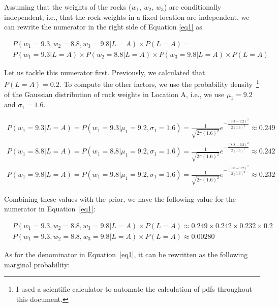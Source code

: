 \documentclass[leqno]{article}
\begin{document}
\noindent Assuming that the weights of the rocks ($w_1$, $w_2$, $w_3$) are conditionally independent, i.e., that the rock weights in a fixed location are independent,
we can rewrite the numerator in the right side of Equation \ref{eq1} as

\begin{equation*}
\begin{split}
&P(w_1 = 9.3, w_2 = 8.8, w_3 = 9.8| L = A) \times P(L = A) = 
\\
&P(w_1 = 9.3 | L = A) \times P(w_2 = 8.8 | L = A) \times P(w_3 = 9.8| L = A) \times P(L = A)
\end{split}
\end{equation*}

\noindent Let us tackle this numerator first. Previously, we calculated that $P(L = A) = 0.2$. To compute the other factors, we use the probability density~\footnote{I used a scientific calculator to automate the calculation of pdfs throughout this document.} of the 
Gaussian distribution of rock weights in Location A, i.e., we use $\mu_1 = 9.2$ and $\sigma_1 = 1.6$.

\begin{equation*}
\begin{split}
P(w_1 = 9.3 | L = A) = P(w_1 = 9.3 | \mu_1 = 9.2, \sigma_1 = 1.6) = \frac{1}{\sqrt{2\pi(1.6)^2}}e^{-\frac{(9.3 - 9.2)^2}{2(1.6)^2}} \approx 0.249 
\\
P(w_1 = 8.8 | L = A) = P(w_1 = 8.8 | \mu_1 = 9.2, \sigma_1 = 1.6) = \frac{1}{\sqrt{2\pi(1.6)^2}}e^{-\frac{(8.8 - 9.2)^2}{2(1.6)^2}} \approx 0.242
\\
P(w_1 = 9.8 | L = A) = P(w_1 = 9.8 | \mu_1 = 9.2, \sigma_1 = 1.6) = \frac{1}{\sqrt{2\pi(1.6)^2}}e^{-\frac{(9.8 - 9.2)^2}{2(1.6)^2}} \approx 0.232
\end{split}
\end{equation*}
  
\noindent Combining these values with the prior, we have the following value for the numerator in Equation~\ref{eq1}:

\begin{equation*}
\begin{split}
&P(w_1 = 9.3, w_2 = 8.8, w_3 = 9.8| L = A) \times P(L = A) \approx 0.249 \times 0.242 \times 0.232 \times 0.2
\\
&P(w_1 = 9.3, w_2 = 8.8, w_3 = 9.8| L = A) \times P(L = A) \approx 0.00280
\end{split} 
\end{equation*}

\noindent As for the denominator in Equation~\ref{eq1}, it can be rewritten as the following marginal probability:
\end{document}

